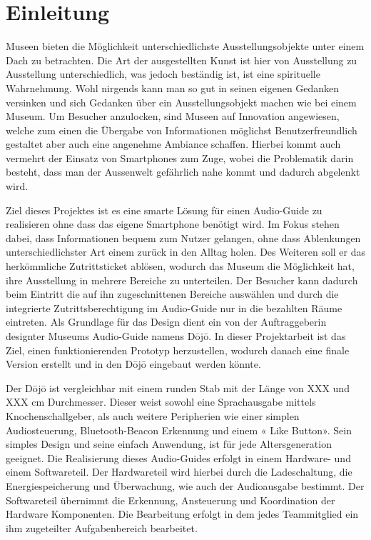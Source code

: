 \section{Einleitung}\label{sec:einleitung}
Museen bieten die Möglichkeit unterschiedlichste Ausstellungsobjekte unter einem Dach zu betrachten. Die Art der ausgestellten Kunst ist hier von Ausstellung zu Ausstellung unterschiedlich, was jedoch beständig ist, ist eine spirituelle Wahrnehmung. Wohl nirgends kann man so gut in seinen eigenen Gedanken versinken und sich Gedanken über ein Ausstellungsobjekt machen wie bei einem Museum. Um Besucher anzulocken, sind Museen auf Innovation angewiesen, welche zum einen die Übergabe von Informationen möglichst Benutzerfreundlich gestaltet aber auch eine angenehme Ambiance schaffen. Hierbei kommt auch vermehrt der Einsatz von Smartphones zum Zuge, wobei die Problematik darin besteht, dass man der Aussenwelt gefährlich nahe kommt und dadurch abgelenkt wird.

Ziel dieses Projektes ist es eine smarte Lösung für einen Audio-Guide zu realisieren ohne dass das eigene Smartphone benötigt wird. Im Fokus stehen dabei, dass Informationen bequem zum Nutzer gelangen, ohne dass Ablenkungen unterschiedlichster Art einem zurück in den Alltag holen. Des Weiteren soll er das herkömmliche Zutrittsticket ablösen, wodurch das Museum die Möglichkeit hat, ihre Ausstellung in mehrere Bereiche zu unterteilen. Der Besucher kann dadurch beim Eintritt die auf ihn zugeschnittenen Bereiche auswählen und durch die integrierte Zutrittsberechtigung im Audio-Guide nur in die bezahlten Räume eintreten. Als Grundlage für das Design dient ein von der Auftraggeberin designter Museums Audio-Guide namens Dōjō. In dieser Projektarbeit ist das Ziel, einen funktionierenden Prototyp herzustellen, wodurch danach eine finale Version erstellt und in den Dōjō eingebaut werden könnte.

Der Dōjō ist vergleichbar mit einem runden Stab mit der Länge von XXX und XXX cm Durchmesser. Dieser weist sowohl eine Sprachausgabe mittels Knochenschallgeber, als auch weitere Peripherien wie einer simplen Audiosteuerung, Bluetooth-Beacon Erkennung und einem «
Like Button». Sein simples Design und seine einfach Anwendung, ist für jede Altersgeneration geeignet. Die Realisierung dieses Audio-Guides erfolgt in einem Hardware- und einem Softwareteil. Der Hardwareteil wird hierbei durch die Ladeschaltung, die Energiespeicherung und Überwachung, wie auch der Audioausgabe bestimmt. Der Softwareteil übernimmt die Erkennung, Ansteuerung und Koordination der Hardware Komponenten. Die Bearbeitung erfolgt in dem jedes Teammitglied ein ihm zugeteilter Aufgabenbereich bearbeitet.

